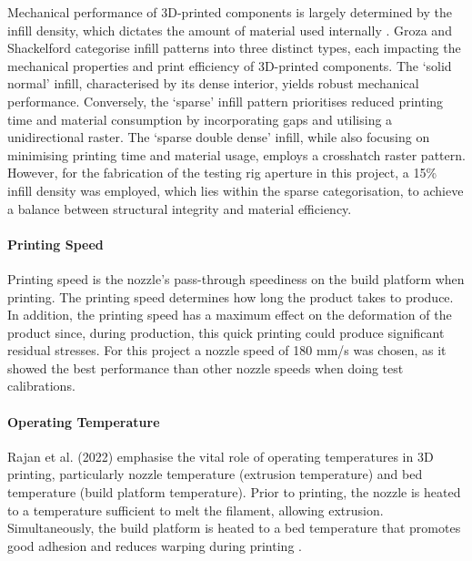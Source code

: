 Mechanical performance of 3D-printed components is largely determined by the infill density, which dictates the amount of material used internally \cite{RefWorks:RefID:89-rajan2022fused}.
Groza and Shackelford \cite{srivatsan2012materials} categorise infill patterns into three distinct types, each impacting the mechanical properties and print efficiency of 3D-printed components. 
The `solid normal' infill, characterised by its dense interior, yields robust mechanical performance. 
Conversely, the `sparse' infill pattern prioritises reduced printing time and material consumption by incorporating gaps and utilising a unidirectional raster. 
The `sparse double dense' infill, while also focusing on minimising printing time and material usage, employs a crosshatch raster pattern. 
However, for the fabrication of the testing rig aperture in this project, a 15\% infill density was employed, which lies within the sparse categorisation, to achieve a balance between structural integrity and material efficiency.

 \paragraph{Printing Speed}

 Printing speed is the nozzle's pass-through speediness on the build platform when printing. 
 The printing speed determines how long the product takes to produce. 
 In addition, the printing speed has a maximum effect on the deformation of the product since, during production, this quick printing could produce significant residual stresses\cite{RefWorks:RefID:89-rajan2022fused}. 
 For this project a nozzle speed of 180 mm/s was chosen, as it showed the best performance than other nozzle speeds when doing test calibrations. 

\paragraph{Operating Temperature}

Rajan et al. (2022) emphasise the vital role of operating temperatures in 3D printing, particularly nozzle temperature (extrusion temperature) and bed temperature (build platform temperature). 
Prior to printing, the nozzle is heated to a temperature sufficient to melt the filament, allowing extrusion. 
Simultaneously, the build platform is heated to a bed temperature that promotes good adhesion and reduces warping during printing \cite{RefWorks:RefID:89-rajan2022fused}.

